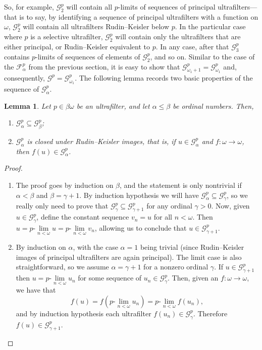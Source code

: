 \documentclass[10pt]{amsart}
\newcommand{\ulim}[2]{#1\text{-}\lim\limits_{#2<\omega}}
\newcommand{\cF}{\mathscr{F}}
\newtheorem{lemma}[theorem]{Lemma}
\theoremstyle{definition}
\theoremstyle{remark}
\begin{document}
So, for example, $\mathscr G_2^p$ will contain all $p$-limits of sequences of principal ultrafilters---that is to say, by identifying a sequence of principal ultrafilters with a function on $\omega$, $\mathscr G_2^p$ will contain all ultrafilters Rudin--Keisler below $p$. In the particular case where $p$ is a selective ultrafilter, $\mathscr G_2^p$ will contain only the ultrafilters that are either principal, or Rudin--Keisler equivalent to $p$. In any case, after that $\mathscr G_3^p$ contains $p$-limits of sequences of elements of $\mathscr G_2^p$, and so on. Similar to the case of the $\cF_\alpha^p$ from the previous section, it is easy to show that $\mathscr G_{\omega_1+1}^p=\mathscr G_{\omega_1}^p$ and, consequently, $\mathscr G^p=\mathscr G_{\omega_1}^p$. The following lemma records two basic properties of the sequence of $\mathscr G_\alpha^p$.

\begin{lemma}\label{lem:galphaproperties}
Let $p\in\beta\omega$ be an ultrafilter, and let $\alpha\leq\beta$ be ordinal numbers. Then,
    \begin{enumerate}
        \item $\mathscr G_\alpha^p\subseteq\mathscr G_\beta^p$;
        \item $\mathscr G_\alpha^p$ is closed under Rudin--Keisler images, that is, if $u\in\mathscr G_\alpha^p$ and $f:\omega\longrightarrow\omega$, then $f(u)\in\mathscr G_\alpha^p$.
    \end{enumerate}
\end{lemma}

\begin{proof}\hfill
    \begin{enumerate}
        \item The proof goes by induction on $\beta$, and the statement is only nontrivial if $\alpha<\beta$ and $\beta=\gamma+1$. By induction hypothesis we will have $\mathscr G_\alpha^p\subseteq\mathscr G_\gamma^p$, so we really only need to prove that $\mathscr G_\gamma^p\subseteq\mathscr G_{\gamma+1}^p$ for any ordinal $\gamma>0$. Now, given $u\in\mathscr G_\gamma^p$, define the constant sequence $v_n=u$ for all $n<\omega$. Then $u=\ulim{p}{n}u=\ulim{p}{n}v_n$, allowing us to conclude that $u\in\mathscr G_{\gamma+1}^p$.
        \item By induction on $\alpha$, with the case $\alpha=1$ being trivial (since Rudin--Keisler images of principal ultrafilters are again principal). The limit case is also straightforward, so we assume $\alpha=\gamma+1$ for a nonzero ordinal $\gamma$. If $u\in\mathscr G_{\gamma+1}^p$ then $u=\ulim{p}{n}u_n$ for some sequence of $u_n\in\mathscr G_\gamma^p$. Then, given an $f:\omega\longrightarrow\omega$, we have that
        \begin{equation*}
            f(u)=f(\ulim{p}{n}u_n)=\ulim{p}{n}f(u_n),
        \end{equation*}
        and by induction hypothesis each ultrafilter $f(u_n)\in\mathscr G_\gamma^p$. Therefore $f(u)\in\mathscr G_{\gamma+1}^p$.
    \end{enumerate}
\end{proof}
\end{document}
